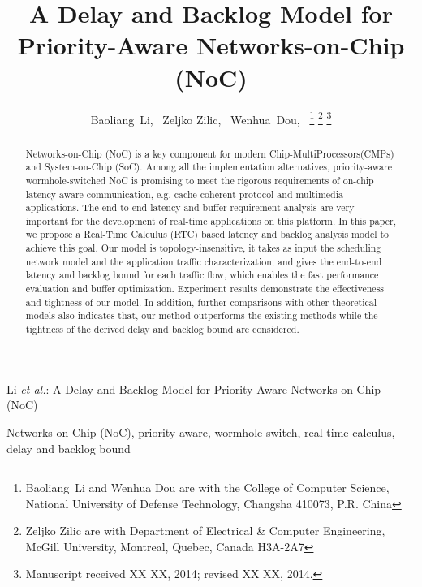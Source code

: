 \documentclass[10pt,journal]{IEEEtran}
\begin{document}
\title{A Delay and Backlog Model for Priority-Aware Networks-on-Chip (NoC)}


\author{Baoliang~Li,~
        Zeljko Zilic,~
        Wenhua~Dou,~%
\thanks{Baoliang~Li and Wenhua Dou are with the College of Computer Science, National University of Defense Technology, Changsha 410073, P.R. China}%
\thanks{Zeljko Zilic are with Department of Electrical \& Computer Engineering, McGill University, Montreal, Quebec, Canada H3A-2A7}%
\thanks{Manuscript received XX XX, 2014; revised XX XX, 2014.}}

%
{Li \MakeLowercase{\textit{et al.}}: A Delay and Backlog Model for Priority-Aware Networks-on-Chip (NoC)}

\maketitle

\begin{abstract}
Networks-on-Chip (NoC) is a key component for modern Chip-MultiProcessors(CMPs) and System-on-Chip (SoC). Among all the implementation alternatives, priority-aware wormhole-switched NoC is promising to meet the rigorous requirements of on-chip latency-aware communication, e.g. cache coherent protocol and multimedia applications. The end-to-end latency and buffer requirement analysis are very important for the development of real-time applications on this platform. In this paper, we propose a Real-Time Calculus (RTC) based latency and backlog analysis model to achieve this goal. Our model is topology-insensitive, it takes as input the scheduling network model and the application traffic characterization, and gives the end-to-end latency and backlog bound for each traffic flow, which enables the fast performance evaluation and buffer optimization. Experiment results demonstrate the effectiveness and tightness of our model. In addition, further comparisons with other theoretical models also indicates that, our method outperforms the existing methods while the tightness of the derived delay and backlog bound are considered.
\end{abstract}
\begin{IEEEkeywords}
Networks-on-Chip (NoC), priority-aware, wormhole switch, real-time calculus, delay and backlog bound
\end{IEEEkeywords}
\end{document}
